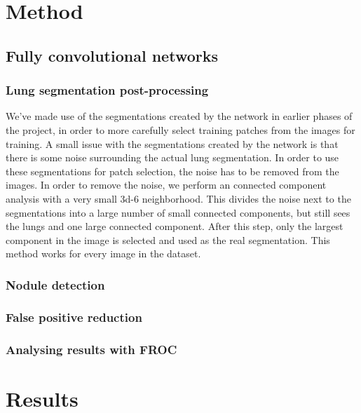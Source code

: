 \documentclass{article}
\begin{document}
\section{Method}\label{sec:method} 
\subsection{Fully convolutional networks}
\subsubsection{Lung segmentation post-processing}
We've made use of the segmentations created by the network in earlier phases of the project, in order to more carefully select training patches from the images for training. A small issue with the segmentations created by the network is that there is some noise surrounding the actual lung segmentation. In order to use these segmentations for patch selection, the noise has to be removed from the images. In order to remove the noise, we perform an connected component analysis with a very small 3d-6 neighborhood. This divides the noise next to the segmentations into a large number of small connected components, but still sees the lungs and one large connected component. After this step, only the largest component in the image is selected and used as the real segmentation. This method works for every image in the dataset.
\cite{long}

\subsubsection{Nodule detection}
\label{sec:fcn}


\subsubsection{False positive reduction}

\subsubsection{Analysing results with FROC}



\section{Results}\label{sec:results}
\end{document}
